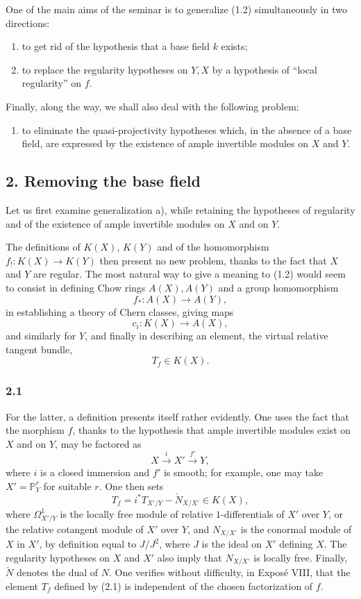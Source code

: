 \documentclass[11pt]{article}
\begin{document}
One of the main aims of the seminar is to generalize (1.2) simultaneously in two directions:
\begin{enumerate}[label=\alph*)]
\item to get rid of the hypothesis that a base field $k$ exists;
\item to replace the regularity hypotheses on $Y,X$ by a hypothesis of ``local regularity'' on $f$.
\end{enumerate}
Finally, along the way, we shall also deal with the following problem:
\begin{enumerate}[label=\alph*),start=3]
\item to eliminate the quasi-projectivity hypotheses which, in the absence of a base field, are expressed by the existence of ample invertible modules on $X$ and $Y$.
\end{enumerate}

\subsection*{2. Removing the base field}
Let us first examine generalization a), while retaining the hypotheses of regularity and of the existence of ample invertible modules on $X$ and on $Y$.

The definitions of $K(X)$, $K(Y)$ and of the homomorphism $f_!:K(X)\to K(Y)$ then present no new problem, thanks to the fact that $X$ and $Y$ are regular. The most natural way to give a meaning to (1.2) would seem to consist in defining Chow rings $A(X),A(Y)$ and a group homomorphism
\[
f_*:A(X)\longrightarrow A(Y),
\]
in establishing a theory of Chern classes, giving maps
\[
c_i:K(X)\longrightarrow A(X),
\]
and similarly for $Y$, and finally in describing an element, the virtual relative tangent bundle,
\[
T_f\in K(X).
\]

\subsubsection*{2.1}
For the latter, a definition presents itself rather evidently. One uses the fact that the morphism $f$, thanks to the hypothesis that ample invertible modules exist on $X$ and on $Y$, may be factored as
\[
X\xrightarrow{i}X'\xrightarrow{f'}Y,
\]
where $i$ is a closed immersion and $f'$ is smooth; for example, one may take $X'=\mathbb P^r_Y$ for suitable $r$. One then sets
\begin{equation}\tag{2.1}
T_f=i^*T_{X'/Y}-\check N_{X/X'}\in K(X),
\end{equation}
where $\Omega^1_{X'/Y}$ is the locally free module of relative $1$-differentials of $X'$ over $Y$, or the relative cotangent module of $X'$ over $Y$, and $N_{X/X'}$ is the conormal module of $X$ in $X'$, by definition equal to $J/J^2$, where $J$ is the ideal on $X'$ defining $X$. The regularity hypotheses on $X$ and $X'$ also imply that $N_{X/X'}$ is locally free. Finally, $\check N$ denotes the dual of $N$. One verifies without difficulty, in Exposé VIII, that the element $T_f$ defined by (2.1) is independent of the chosen factorization of $f$.
\end{document}
